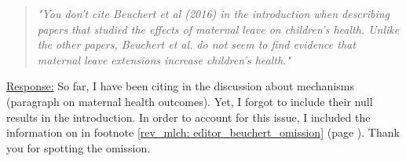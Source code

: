 \bigskip
\begin{quote}
	\textit{"You don’t cite Beuchert et al (2016) in the introduction when describing papers that studied the effects of maternal leave on children’s health. Unlike the other papers, Beuchert et al. do not seem to find evidence that maternal leave extensions increase children’s health."}
\end{quote}
\underline{Response:} So far, I have been citing \cite{beuchert2016} in the discussion about mechanisms (paragraph on maternal health outcomes). Yet, I forgot to include their null results in the introduction. In order to account for this issue, I included the information on \cite{beuchert2016} in footnote \ref{rev_mlch: editor_beuchert_omission} (page \pageref{rev_mlch: editor_beuchert_omission}). Thank you for spotting the omission.
